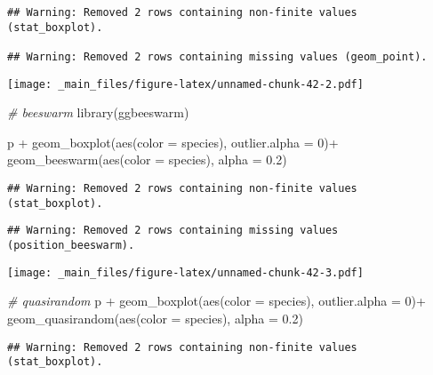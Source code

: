 \documentclass[
]{book}
\newenvironment{Shaded}{\begin{snugshade}}{\end{snugshade}}
\newcommand{\AttributeTok}[1]{\textcolor[rgb]{0.77,0.63,0.00}{#1}}
\newcommand{\CommentTok}[1]{\textcolor[rgb]{0.56,0.35,0.01}{\textit{#1}}}
\newcommand{\DecValTok}[1]{\textcolor[rgb]{0.00,0.00,0.81}{#1}}
\newcommand{\FloatTok}[1]{\textcolor[rgb]{0.00,0.00,0.81}{#1}}
\newcommand{\FunctionTok}[1]{\textcolor[rgb]{0.00,0.00,0.00}{#1}}
\newcommand{\NormalTok}[1]{#1}
\newcommand{\SpecialCharTok}[1]{\textcolor[rgb]{0.00,0.00,0.00}{#1}}
\begin{document}
\begin{verbatim}
## Warning: Removed 2 rows containing non-finite values (stat_boxplot).

## Warning: Removed 2 rows containing missing values (geom_point).
\end{verbatim}

\texttt{[image: \_main\_files/figure-latex/unnamed-chunk-42-2.pdf]}

\begin{Shaded}
\begin{Highlighting}[]
\CommentTok{\# beeswarm}
\FunctionTok{library}\NormalTok{(ggbeeswarm)}

\NormalTok{p }\SpecialCharTok{+} \FunctionTok{geom\_boxplot}\NormalTok{(}\FunctionTok{aes}\NormalTok{(}\AttributeTok{color =}\NormalTok{ species), }\AttributeTok{outlier.alpha =} \DecValTok{0}\NormalTok{)}\SpecialCharTok{+}
  \FunctionTok{geom\_beeswarm}\NormalTok{(}\FunctionTok{aes}\NormalTok{(}\AttributeTok{color =}\NormalTok{ species), }\AttributeTok{alpha =} \FloatTok{0.2}\NormalTok{)}
\end{Highlighting}
\end{Shaded}

\begin{verbatim}
## Warning: Removed 2 rows containing non-finite values (stat_boxplot).
\end{verbatim}

\begin{verbatim}
## Warning: Removed 2 rows containing missing values (position_beeswarm).
\end{verbatim}

\texttt{[image: \_main\_files/figure-latex/unnamed-chunk-42-3.pdf]}

\begin{Shaded}
\begin{Highlighting}[]
\CommentTok{\# quasirandom}
\NormalTok{p }\SpecialCharTok{+} \FunctionTok{geom\_boxplot}\NormalTok{(}\FunctionTok{aes}\NormalTok{(}\AttributeTok{color =}\NormalTok{ species), }\AttributeTok{outlier.alpha =} \DecValTok{0}\NormalTok{)}\SpecialCharTok{+}
  \FunctionTok{geom\_quasirandom}\NormalTok{(}\FunctionTok{aes}\NormalTok{(}\AttributeTok{color =}\NormalTok{ species), }\AttributeTok{alpha =} \FloatTok{0.2}\NormalTok{)}
\end{Highlighting}
\end{Shaded}

\begin{verbatim}
## Warning: Removed 2 rows containing non-finite values (stat_boxplot).
\end{verbatim}
\end{document}
